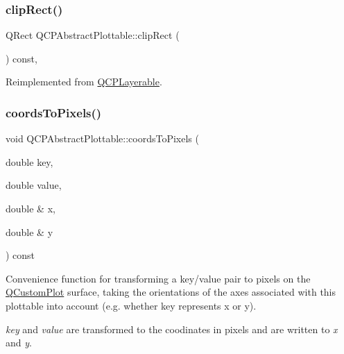 \mbox{\label{class_q_c_p_abstract_plottable_a635cee3effc07ad421414c76fd83548c}} 
\subsubsection{\texorpdfstring{clipRect()}{clipRect()}}
{\footnotesize\ttfamily Q\+Rect Q\+C\+P\+Abstract\+Plottable\+::clip\+Rect (\begin{DoxyParamCaption}{ }\end{DoxyParamCaption}) const\hspace{0.3cm}{\ttfamily [protected]}, {\ttfamily [virtual]}}



Reimplemented from \mbox{\hyperlink{class_q_c_p_layerable_acbcfc9ecc75433747b1978a77b1864b3}{Q\+C\+P\+Layerable}}.

\mbox{\label{class_q_c_p_abstract_plottable_a7ad84a36472441cf1f555c5683d0da93}} 
\subsubsection{\texorpdfstring{coordsToPixels()}{coordsToPixels()}\hspace{0.1cm}{\footnotesize\ttfamily [1/2]}}
{\footnotesize\ttfamily void Q\+C\+P\+Abstract\+Plottable\+::coords\+To\+Pixels (\begin{DoxyParamCaption}\item[{double}]{key,  }\item[{double}]{value,  }\item[{double \&}]{x,  }\item[{double \&}]{y }\end{DoxyParamCaption}) const}

Convenience function for transforming a key/value pair to pixels on the \mbox{\hyperlink{class_q_custom_plot}{Q\+Custom\+Plot}} surface, taking the orientations of the axes associated with this plottable into account (e.\+g. whether key represents x or y).

{\itshape key} and {\itshape value} are transformed to the coodinates in pixels and are written to {\itshape x} and {\itshape y}.

